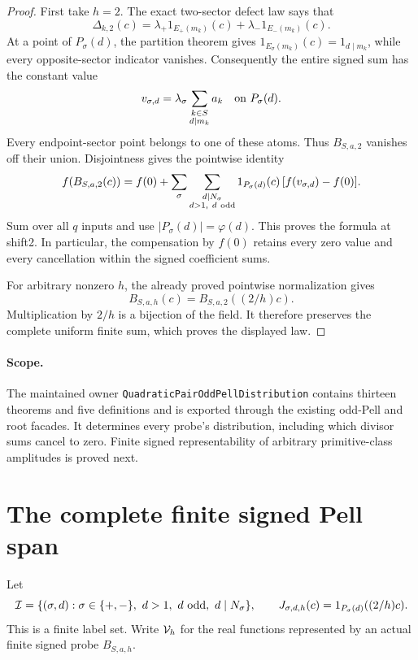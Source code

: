 \documentclass[11pt]{article}
\begin{document}
\begin{proof}
First take \(h=2\). The exact two-sector defect law says that
\[
 \Delta_{k,2}(c)
   =\lambda_+1_{E_+(m_k)}(c)+
      \lambda_-1_{E_-(m_k)}(c).
\]
At a point of \(P_\sigma(d)\), the partition theorem gives
\(1_{E_\sigma(m_k)}(c)=1_{d\mid m_k}\), while every opposite-sector
indicator vanishes. Consequently the entire signed sum has the
constant value
\[
 v_{\sigma,d}=\lambda_\sigma
                 \sum_{\substack{k\in S\\d\mid m_k}}a_k
 \quad\hbox{on }P_\sigma(d).
\]
Every endpoint-sector point belongs to one of these atoms.
Thus \(B_{S,a,2}\) vanishes off their union. Disjointness gives
the pointwise identity
\[
 f(B_{S,a,2}(c))
   =f(0)+\sum_{\sigma}\sum_{\substack{d\mid N_\sigma\\d>1,\ d\ {\rm odd}}}
       1_{P_\sigma(d)}(c)\,[f(v_{\sigma,d})-f(0)].
\]
Sum over all \(q\) inputs and use
\(|P_\sigma(d)|=\varphi(d)\). This proves the formula at shift2.
In particular, the compensation by \(f(0)\) retains every zero
value and every cancellation within the signed coefficient sums.

For arbitrary nonzero \(h\), the already proved pointwise
normalization gives
\[
 B_{S,a,h}(c)=B_{S,a,2}((2/h)c).
\]
Multiplication by \(2/h\) is a bijection of the field.
It therefore preserves the complete uniform finite sum,
which proves the displayed law.
\end{proof}

\paragraph{Scope.}
The maintained owner \texttt{QuadraticPairOddPellDistribution}
contains thirteen theorems and five definitions and is exported
through the existing odd-Pell and root facades.
It determines every probe's distribution, including which divisor
sums cancel to zero. Finite signed representability of arbitrary
primitive-class amplitudes is proved next.

\section{The complete finite signed Pell span}
\label{sec:odd-pell-signed-span}

Let
\[
 {\cal I}=\{(\sigma,d):\sigma\in\{+,-\},\
                 d>1,\ d\text{ odd},\ d\mid N_\sigma\},
 \qquad
 J_{\sigma,d,h}(c)=1_{P_\sigma(d)}((2/h)c).
\]
This is a finite label set. Write \({\cal V}_h\) for the real
functions represented by an actual finite signed probe
\(B_{S,a,h}\).
\end{document}

